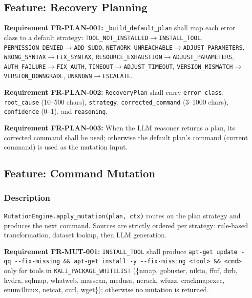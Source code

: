 \documentclass[10pt,journal,onecolumn]{IEEEtran}
\newcommand{\reqid}[1]{\textbf{#1}}
\begin{document}
\subsection{Feature: Recovery Planning}

\reqid{Requirement FR-PLAN-001:} \texttt{\_build\_default\_plan} shall map each error class to a default strategy: \texttt{TOOL\_\allowbreak NOT\_\allowbreak INSTALLED$\rightarrow$INSTALL\_\allowbreak TOOL}, \texttt{PERMISSION\_\allowbreak DENIED$\rightarrow$ADD\_\allowbreak SUDO}, \texttt{NETWORK\_\allowbreak UNREACHABLE$\rightarrow$ADJUST\_\allowbreak PARAMETERS}, \texttt{WRONG\_\allowbreak SYNTAX$\rightarrow$FIX\_\allowbreak SYNTAX}, \texttt{RESOURCE\_\allowbreak EXHAUSTION$\rightarrow$ADJUST\_\allowbreak PARAMETERS}, \texttt{AUTH\_\allowbreak FAILURE$\rightarrow$FIX\_\allowbreak AUTH}, \texttt{TIMEOUT$\rightarrow$ADJUST\_\allowbreak TIMEOUT}, \texttt{VERSION\_\allowbreak MISMATCH$\rightarrow$VERSION\_\allowbreak DOWNGRADE}, \texttt{UNKNOWN$\rightarrow$ESCALATE}.

\reqid{Requirement FR-PLAN-002:} \texttt{RecoveryPlan} shall carry \texttt{error\_class}, \texttt{root\_cause} (10--500 chars), \texttt{strategy}, \texttt{corrected\_command} (3--1000 chars), \texttt{confidence} (0--1), and \texttt{reasoning}.

\reqid{Requirement FR-PLAN-003:} When the LLM reasoner returns a plan, its corrected command shall be used; otherwise the default plan's command (current command) is used as the mutation input.

\subsection{Feature: Command Mutation}

\subsubsection{Description}

\texttt{MutationEngine.\allowbreak apply\_\allowbreak mutation(plan, ctx)} routes on the plan strategy and produces the next command. Sources are strictly ordered per strategy: rule-based transformation, dataset lookup, then LLM generation.

\reqid{Requirement FR-MUT-001:} \texttt{INSTALL\_TOOL} shall produce \texttt{apt-\allowbreak get update -\allowbreak qq -\allowbreak -\allowbreak fix-\allowbreak missing \&\& apt-\allowbreak get install -\allowbreak y -\allowbreak -\allowbreak fix-\allowbreak missing <tool> \&\& <cmd>} only for tools in \texttt{KALI\_PACKAGE\_WHITELIST} (\{nmap, gobuster, nikto, ffuf, dirb, hydra, sqlmap, whatweb, masscan, medusa, ncrack, wfuzz, crackmapexec, enum4linux, netcat, curl, wget\}); otherwise no mutation is returned.
\end{document}
